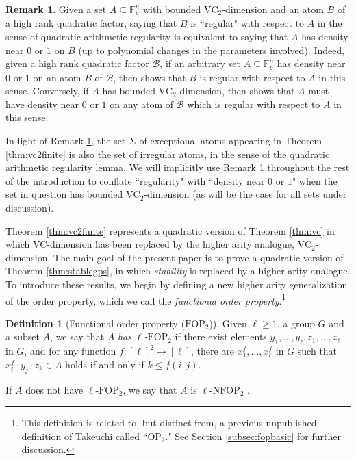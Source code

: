 \documentclass[12pt,oneside,british,a4wide]{amsart}
\numberwithin{equation}{section}
\theoremstyle{definition}
\newtheorem{definition}[theorem]{Definition}
\newtheorem{remark}[theorem]{Remark}
\def\F{\mathbb{F}}
\def\OP{\mathrm{OP}}
\def\FOP{\mathrm{FOP}}
\def\NFOP{\mathrm{NFOP}}
\def\VC{\mathrm{VC}}
\newcommand{\calB}{\mathcal{B}}
\begin{document}
 \begin{remark}\label{rem:vc2}
Given a set $A\subseteq \F_p^n$ with bounded $\VC_2$-dimension and an atom $B$ of a high rank quadratic factor, saying that $B$ is ``regular" with respect to $A$ in the sense of quadratic arithmetic regularity is equivalent to saying that $A$ has density near $0$ or $1$ on $B$ (up to polynomial changes in the parameters involved).       Indeed, given a high rank quadratic factor $\calB$,  if an arbitrary set $A\subseteq \F_p^n$  has density near $0$ or $1$ on an atom $B$ of $\calB$, then \cite[Proposition 3.20]{Terry.2021d} shows that $B$ is  regular  with respect to $A$ in this sense.  Conversely, if $A$ has bounded $\VC_2$-dimension, then  \cite[Proposition 4.3]{Terry.2021d} shows that $A$ must have density near $0$ or $1$ on any atom of $\calB$ which is regular with respect to $A$  in this sense.  
 \end{remark}

In light of Remark \ref{rem:vc2}, the set $\Sigma$ of exceptional atoms appearing in Theorem \ref{thm:vc2finite} is also the set of irregular  atoms, in the sense of the quadratic arithmetic regularity lemma. We will implicitly use Remark \ref{rem:vc2} throughout the rest of the introduction to conflate ``regularity" with ``density near $0$ or $1$" when the set in question has bounded $\VC_2$-dimension (as will be the case for all sets under discussion).  
 

Theorem \ref{thm:vc2finite} represents a quadratic version of Theorem \ref{thm:vc} in which VC-dimension has been replaced by the higher arity analogue, $\VC_2$-dimension. The main goal of the present paper is to prove a quadratic version of Theorem \ref{thm:stablegps}, in which \emph{stability} is replaced by a higher arity analogue.  To introduce these results, we begin by defining a new higher arity generalization of the order property, which we call the \emph{functional order property}.\footnote{This definition is related to, but distinct from, a previous unpublished definition of Takeuchi called ``$\OP_2$." See Section \ref{subsec:fopbasic} for further discussion.}

\begin{definition}[Functional order property ($\FOP_2$)]\label{def:fop}
Given $\ell\geq 1$, a group $G$ and a subset $A$, we say that $A$ \emph{has $\ell$-$\FOP_2$} if there exist elements $y_1, \dots,y_\ell, z_1, \dots,z_\ell$ in $G$, and for any function $f:[\ell]^2\rightarrow [\ell]$, there are $x^f_1,\dots,x^f_\ell$ in $G$ such that $x^f_i\cdot y_j\cdot z_k \in A$ holds if and only if $k\leq f(i,j)$. 

If $A$ does not have $\ell$-$\FOP_2$, we say that $A$ is $\ell$-$\NFOP_2$ .
\end{definition}
\end{document}
